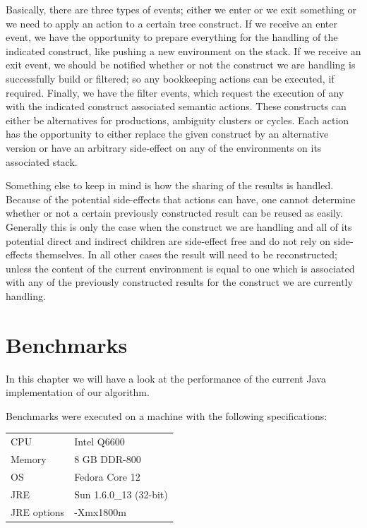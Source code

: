 \documentclass[a4paper,10pt]{article}
\begin{document}
Basically, there are three types of events; either we enter or we exit something or we need to apply an action to a certain tree construct. If we receive an enter event, we have the opportunity to prepare everything for the handling of the indicated construct, like pushing a new environment on the stack. If we receive an exit event, we should be notified whether or not the construct we are handling is successfully build or filtered; so any bookkeeping actions can be executed, if required. Finally, we have the filter events, which request the execution of any with the indicated construct associated semantic actions. These constructs can either be alternatives for productions, ambiguity clusters or cycles. Each action has the opportunity to either replace the given construct by an alternative version or have an arbitrary side-effect on any of the environments on its associated stack.

Something else to keep in mind is how the sharing of the results is handled. Because of the potential side-effects that actions can have, one cannot determine whether or not a certain previously constructed result can be reused as easily. Generally this is only the case when the construct we are handling and all of its potential direct and indirect children are side-effect free and do not rely on side-effects themselves. In all other cases the result will need to be reconstructed; unless the content of the current environment is equal to one which is associated with any of the previously constructed results for the construct we are currently handling.

\section{Benchmarks}

In this chapter we will have a look at the performance of the current Java implementation of our algorithm.

Benchmarks were executed on a machine with the following specifications:
\begin{table}[H]
\centering
\begin{tabular}{ | p{6em} | p{9em} | }
 \hline
 CPU & Intel Q6600 \\
 Memory & 8 GB DDR-800 \\
 OS & Fedora Core 12 \\
 JRE & Sun 1.6.0\_13 (32-bit) \\
 JRE options & -Xmx1800m \\
 \hline
\end{tabular}
\end{table}
\end{document}
